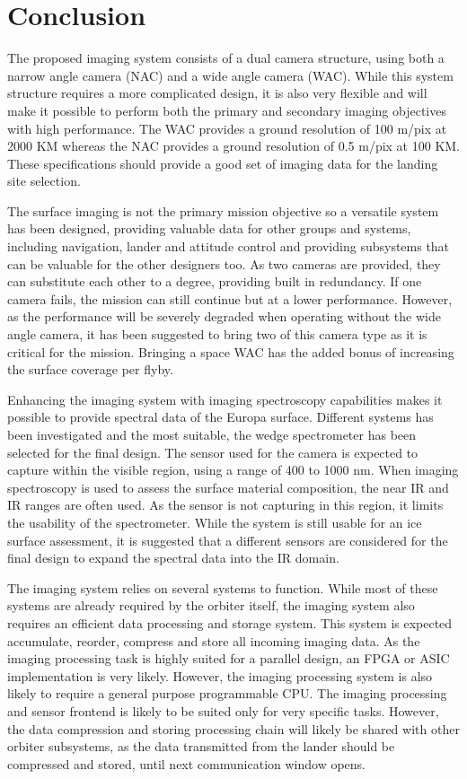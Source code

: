 \section{Conclusion}
The proposed imaging system consists of a dual camera structure, using both a narrow angle camera (NAC) and a wide angle camera (WAC). While this system structure requires a more complicated design, it is also very flexible and will make it possible to perform both the primary and secondary imaging objectives with high performance. The WAC provides a ground resolution of 100 m/pix at 2000 KM whereas the NAC provides a ground resolution of 0.5 m/pix at 100 KM. These specifications should provide a good set of imaging data for the landing site selection.

The surface imaging is not the primary mission objective so a versatile system has been designed, providing valuable data for other groups and systems, including navigation, lander and attitude control and providing subsystems that can be valuable for the other designers too. As two cameras are provided, they can substitute each other to a degree, providing built in redundancy. If one camera fails, the mission can still continue but at a lower performance. However, as the performance will be severely degraded when operating without the wide angle camera, it has been suggested to bring two of this camera type as it is critical for the mission. Bringing a space WAC has the added bonus of increasing the surface coverage per flyby.

Enhancing the imaging system with imaging spectroscopy capabilities makes it possible to provide spectral data of the Europa surface. Different systems has been investigated and the most suitable, the wedge spectrometer has been selected for the final design. The sensor used for the camera is expected to capture within the visible region, using a range of 400 to 1000 nm. When imaging spectroscopy is used to assess the surface material composition, the near IR and IR ranges are often used. As the sensor is not capturing in this region, it limits the usability of the spectrometer. While the system is still usable for an ice surface assessment, it is suggested that a different sensors are considered for the final design to expand the spectral data into the IR domain.

The imaging system relies on several systems to function. While most of these systems are already required by the orbiter itself, the imaging system also requires an efficient data processing and storage system. This system is expected accumulate, reorder, compress and store all incoming imaging data. As the imaging processing task is highly suited for a parallel design, an FPGA or ASIC implementation is very likely. However, the imaging processing system is also likely to require a general purpose programmable CPU. The imaging processing and sensor frontend is likely to be suited only for very specific tasks. However, the data compression and storing processing chain will likely be shared with other orbiter subsystems, as the data transmitted from the lander should be compressed and stored, until next communication window opens.

